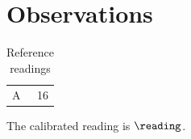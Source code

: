 \section{Observations}
\begin{table}
\caption{Reference readings}
\label{tab:reading}
\begin{tabular}{lr}A & 16\\\end{tabular}
\end{table}
The calibrated reading is $\reading$.
